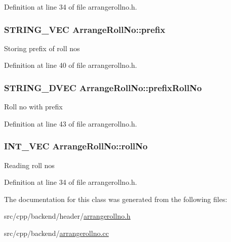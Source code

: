 Definition at line 34 of file arrangerollno.\-h.

\hypertarget{classArrangeRollNo_ac70b1f6e601cc5786ef339a38ae18c6f}{
\subsubsection[{prefix}]{\setlength{\rightskip}{0pt plus 5cm}S\-T\-R\-I\-N\-G\-\_\-\-V\-E\-C Arrange\-Roll\-No\-::prefix\hspace{0.3cm}{\ttfamily [protected]}}}\label{classArrangeRollNo_ac70b1f6e601cc5786ef339a38ae18c6f}
Storing prefix of roll nos 

Definition at line 40 of file arrangerollno.\-h.

\hypertarget{classArrangeRollNo_aa0401159b5d59c7afe77980a391a9a0a}{
\subsubsection[{prefix\-Roll\-No}]{\setlength{\rightskip}{0pt plus 5cm}S\-T\-R\-I\-N\-G\-\_\-D\-V\-E\-C Arrange\-Roll\-No\-::prefix\-Roll\-No\hspace{0.3cm}{\ttfamily [protected]}}}\label{classArrangeRollNo_aa0401159b5d59c7afe77980a391a9a0a}
Roll no with prefix 

Definition at line 43 of file arrangerollno.\-h.

\hypertarget{classArrangeRollNo_ad75d3ee3f709606da5b4871098c3e978}{
\subsubsection[{roll\-No}]{\setlength{\rightskip}{0pt plus 5cm}I\-N\-T\-\_\-\-V\-E\-C Arrange\-Roll\-No\-::roll\-No\hspace{0.3cm}{\ttfamily [protected]}}}\label{classArrangeRollNo_ad75d3ee3f709606da5b4871098c3e978}
Reading roll nos 

Definition at line 34 of file arrangerollno.\-h.



The documentation for this class was generated from the following files\-:\begin{DoxyCompactItemize}
\item 
src/cpp/backend/header/\hyperlink{arrangerollno_8h}{arrangerollno.\-h}\item 
src/cpp/backend/\hyperlink{arrangerollno_8cc}{arrangerollno.\-cc}\end{DoxyCompactItemize}
